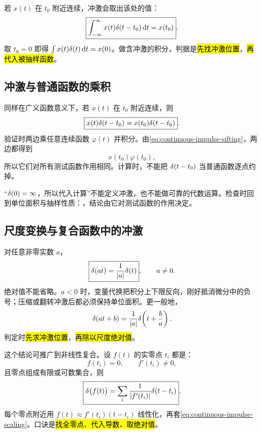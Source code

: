 若 $x(t)$ 在 $t_0$ 附近连续，冲激会取出该处的值：
\begin{equation}
  \boxed{
    \int_{-\infty}^{\infty}x(t)\delta(t-t_0)\mathop{}\!\mathrm{d} t=x(t_0)
  }.
  \label{eq:continuous-impulse-sifting}
\end{equation}
取 $t_0=0$ 即得 $\int x(t)\delta(t)\mathop{}\!\mathrm{d} t=x(0)$。做含冲激的积分，判据是\hl{先找冲激位置}，\hl{再代入被抽样函数}。

\subsection{冲激与普通函数的乘积}

同样在广义函数意义下，若 $x(t)$ 在 $t_0$ 附近连续，则
\begin{equation}
  \boxed{
    x(t)\delta(t-t_0)=x(t_0)\delta(t-t_0)
  }.
  \label{eq:continuous-impulse-product}
\end{equation}
验证时两边乘任意连续函数 $\varphi(t)$ 并积分。由\cref{eq:continuous-impulse-sifting}，两边都得到
\[
  x(t_0)\varphi(t_0),
\]
所以它们对所有测试函数作用相同。计算时，不能把 $\delta(t-t_0)$ 当普通函数逐点约掉。

\begin{pitfall}[把单位冲激当成普通函数]
  “$\delta(0)=\infty$，所以代入计算”不能定义冲激，也不能做可靠的代数运算。检查时回到单位面积与抽样性质：，结论由它对测试函数的作用决定。
\end{pitfall}

\subsection{尺度变换与复合函数中的冲激}

对任意非零实数 $a$，
\begin{equation}
  \boxed{
    \delta(at)=\frac{1}{|a|}\delta(t)
  },
  \qquad a\neq0.
  \label{eq:continuous-impulse-scaling}
\end{equation}
绝对值不能省略。$a<0$ 时，变量代换把积分上下限反向，刚好抵消微分中的负号；压缩或翻转冲激后都必须保持单位面积。更一般地，
\begin{equation}
  \delta(at+b)
  =\frac{1}{|a|}\delta\!\left(t+\frac{b}{a}\right).
  \label{eq:impulse-affine-scaling}
\end{equation}
判定时\hl{先求冲激位置}，\hl{再除以尺度绝对值}。

这个结论可推广到非线性复合。设 $f(t)$ 的实零点 $t_i$ 都是：
\[
  f(t_i)=0,
  \qquad
  f'(t_i)\neq0,
\]
且零点组成有限或可数集合，则
\begin{equation}
  \boxed{
    \delta\bigl(f(t)\bigr)
    =\sum_{i}\frac{1}{|f'(t_i)|}\delta(t-t_i)
  }.
  \label{eq:impulse-composite-function}
\end{equation}
每个零点附近用 $f(t)\approx f'(t_i)(t-t_i)$ 线性化，再套\cref{eq:continuous-impulse-scaling}。口诀是\hl{找全零点、代入导数、取绝对值}。


